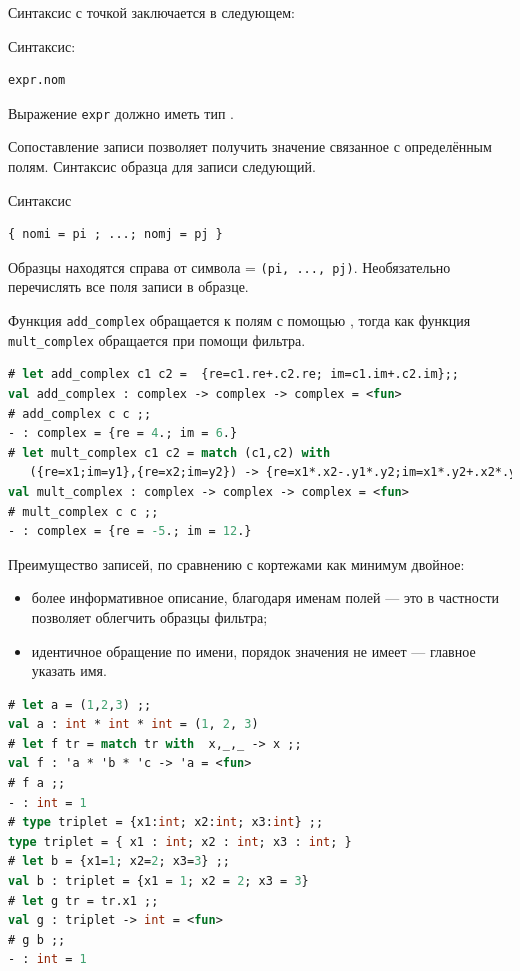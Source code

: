 Синтаксис с точкой заключается в следующем:

Синтаксис:

\begin{lstlisting}[language=OCaml]
expr.nom
\end{lstlisting}

Выражение \texttt{expr} должно иметь тип .

Сопоставление записи позволяет получить значение связанное с определённым полям.
Синтаксис образца для записи следующий.

Синтаксис 

\begin{lstlisting}[language=OCaml]
{ nomi = pi ; ...; nomj = pj }
\end{lstlisting}

Образцы находятся справа от символа = \texttt{(pi, ..., pj)}. Необязательно
перечислять все поля записи в образце.

Функция \texttt{add\_complex} обращается к полям с помощью , тогда
как функция \texttt{mult\_complex} обращается при помощи фильтра.

\begin{lstlisting}[language=OCaml]
# let add_complex c1 c2 =  {re=c1.re+.c2.re; im=c1.im+.c2.im};;
val add_complex : complex -> complex -> complex = <fun>
# add_complex c c ;;
- : complex = {re = 4.; im = 6.}
# let mult_complex c1 c2 = match (c1,c2) with
   ({re=x1;im=y1},{re=x2;im=y2}) -> {re=x1*.x2-.y1*.y2;im=x1*.y2+.x2*.y1} ;;
val mult_complex : complex -> complex -> complex = <fun>
# mult_complex c c ;;
- : complex = {re = -5.; im = 12.}
\end{lstlisting}

Преимущество записей, по сравнению с кортежами как минимум двойное:

\begin{itemize}
	\item более информативное описание, благодаря именам полей --- это в
частности позволяет облегчить образцы фильтра;

	\item идентичное обращение по имени, порядок значения не имеет --- главное
указать имя.
\end{itemize}

\begin{lstlisting}[language=OCaml]
# let a = (1,2,3) ;;
val a : int * int * int = (1, 2, 3)
# let f tr = match tr with  x,_,_ -> x ;;
val f : 'a * 'b * 'c -> 'a = <fun>
# f a ;;
- : int = 1
# type triplet = {x1:int; x2:int; x3:int} ;;
type triplet = { x1 : int; x2 : int; x3 : int; }
# let b = {x1=1; x2=2; x3=3} ;;
val b : triplet = {x1 = 1; x2 = 2; x3 = 3}
# let g tr = tr.x1 ;;
val g : triplet -> int = <fun>
# g b ;;
- : int = 1
\end{lstlisting}

